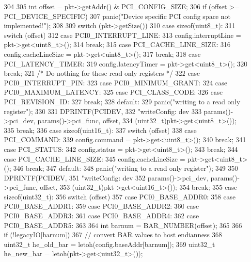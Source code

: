 \begin{DoxyCode}
304 {
305     int offset = pkt->getAddr() & PCI_CONFIG_SIZE;
306     if (offset >= PCI_DEVICE_SPECIFIC)
307         panic("Device specific PCI config space not implemented!\n");
308 
309     switch (pkt->getSize()) {
310       case sizeof(uint8_t):
311         switch (offset) {
312           case PCI0_INTERRUPT_LINE:
313             config.interruptLine = pkt->get<uint8_t>();
314             break;
315           case PCI_CACHE_LINE_SIZE:
316             config.cacheLineSize = pkt->get<uint8_t>();
317             break;
318           case PCI_LATENCY_TIMER:
319             config.latencyTimer = pkt->get<uint8_t>();
320             break;
321           /* Do nothing for these read-only registers */
322           case PCI0_INTERRUPT_PIN:
323           case PCI0_MINIMUM_GRANT:
324           case PCI0_MAXIMUM_LATENCY:
325           case PCI_CLASS_CODE:
326           case PCI_REVISION_ID:
327             break;
328           default:
329             panic("writing to a read only register");
330         }
331         DPRINTF(PCIDEV,
332             "writeConfig: dev %
333             params()->pci_dev, params()->pci_func, offset,
334             (uint32_t)pkt->get<uint8_t>());
335         break;
336       case sizeof(uint16_t):
337         switch (offset) {
338           case PCI_COMMAND:
339             config.command = pkt->get<uint8_t>();
340             break;
341           case PCI_STATUS:
342             config.status = pkt->get<uint8_t>();
343             break;
344           case PCI_CACHE_LINE_SIZE:
345             config.cacheLineSize = pkt->get<uint8_t>();
346             break;
347           default:
348             panic("writing to a read only register");
349         }
350         DPRINTF(PCIDEV,
351             "writeConfig: dev %
352             params()->pci_dev, params()->pci_func, offset,
353             (uint32_t)pkt->get<uint16_t>());
354         break;
355       case sizeof(uint32_t):
356         switch (offset) {
357           case PCI0_BASE_ADDR0:
358           case PCI0_BASE_ADDR1:
359           case PCI0_BASE_ADDR2:
360           case PCI0_BASE_ADDR3:
361           case PCI0_BASE_ADDR4:
362           case PCI0_BASE_ADDR5:
363             {
364                 int barnum = BAR_NUMBER(offset);
365 
366                 if (!legacyIO[barnum]) {
367                     // convert BAR values to host endianness
368                     uint32_t he_old_bar = letoh(config.baseAddr[barnum]);
369                     uint32_t he_new_bar = letoh(pkt->get<uint32_t>());
}}}}}
\end{DoxyCode}
